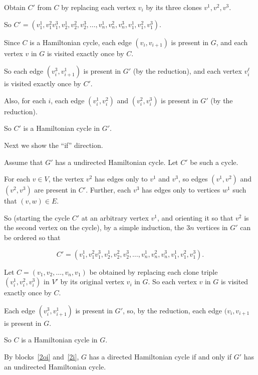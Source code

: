 \documentclass[11pt]{article}
\begin{document}
\begin{problems}
\begin{longFormProof}
\begin{block}[2oi]
      \step Obtain $C'$ from $C$ by replacing each vertex $v_i$ by its three clones $v^1, v^2, v^3$.

      \step So $C'=(v^1_1, v^2_1 v^3_1, v^1_2, v^2_2, v^3_2, \ldots, v^1_n,  v^2_n,  v^3_n,  v^1_1,  v^2_1,  v^3_1)$.

      \step Since $C$ is a Hamiltonian cycle, each edge $(v_i, v_{i+1})$ is present in $G$,
      and each vertex $v$ in $G$ is visited exactly once by $C$.

      \step So each edge $(v^3_i, v^1_{i+1})$ is present in $G'$ (by the reduction),
      and each vertex $v_i^\ell$ is visited exactly once by $C'$.

      \step Also, for each $i$, each edge $(v^1_i, v^2_i)$ and $(v^2_i, v^3_i)$ is present in $G'$ (by the reduction). 

      \step So $C'$ is a Hamiltonian cycle in $G'$.

      \smallskip 
    \end{block} 
    \step Next we show the ``if'' direction.
    \begin{block}[2i]
      {Assume that $G'$ has a undirected Hamiltonian cycle.}
      \step Let $C'$ be such a cycle.
      \smallskip 

      \step For each $v\in V$, the vertex $v^2$ has edges only to $v^1$ and $v^3$,
      so edges $(v^1, v^2)$ and $(v^2, v^3)$ are present in $C'$.
      Further, each $v^3$ has edges only to vertices $w^1$ such that $(v,w)\in E$.

      \step So (starting the cycle $C'$ at an arbitrary vertex $v^1$, and orienting it so that
      $v^2$ is the second vertex on the cycle), by a simple induction, the $3n$ vertices in $G'$ can be ordered so that

      \[C'=(v^1_1, v^2_1 v^3_1, v^1_2, v^2_2, v^3_2, \ldots, v^1_n,  v^2_n,  v^3_n,  v^1_1,  v^2_1,  v^3_1).\]

      \step Let $C=(v_1, v_2, \ldots, v_n, v_1)$ be obtained by replacing each clone triple $(v_i^1, v_i^2, v_i^3)$ in $V'$
      by its original vertex $v_i$ in $G$.
      So each vertex $v$ in $G$ is visited exactly once by $C$.

      \step Each edge $(v^3_i, v_{i+1}^1)$ is present in $G'$, so, by the reduction,
      each edge $(v_i, v_{i+1}$ is present in $G$.

      \step So $C$ is a Hamiltonian cycle in $G$.

      \smallskip 
    \end{block} 
    \step By blocks~\ref{2oi} and~\ref{2i},
    $G$ has a directed Hamiltonian cycle
    if and only if $G'$ has an undirected Hamiltonian cycle.
  \end{longFormProof}


\end{problems}
\end{document}
